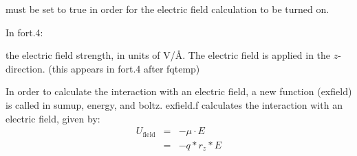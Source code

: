 \documentclass[12pt,letterpaper]{article}
\begin{document}
{{{{{{ must be set to true in order
for the electric field calculation to be turned on.

\noindent  In fort.4:

 the electric field strength, in units of V/\AA.  The electric field is applied in the
$z$-direction. (this appears in fort.4 after fqtemp)

\noindent In order to calculate the interaction with an electric field, a new function (exfield) is called in sumup,
energy, and boltz.  exfield.f calculates the interaction with an electric field, given by:
\begin{eqnarray*}
U_{\textrm{field}} & = & -\mu \cdot E \\
& = & -q * r_z * E
\end{eqnarray*}


%


}}}}}}
\end{document}
